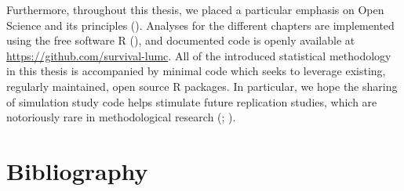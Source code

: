 \documentclass[
  letterpaper,
  DIV=11,
  numbers=noendperiod]{scrreprt}
\begin{document}
Furthermore, throughout this thesis, we placed a particular emphasis on
Open Science and its principles
(). Analyses for the different chapters are
implemented using the free software R
(), and documented code is openly available at
\url{https://github.com/survival-lumc}. All of the introduced
statistical methodology in this thesis is accompanied by minimal code
which seeks to leverage existing, regularly maintained, open source R
packages. In particular, we hope the sharing of simulation study code
helps stimulate future replication studies, which are notoriously rare
in methodological research
(; ).


\chapter*{Bibliography}\label{bibliography}

\end{document}
